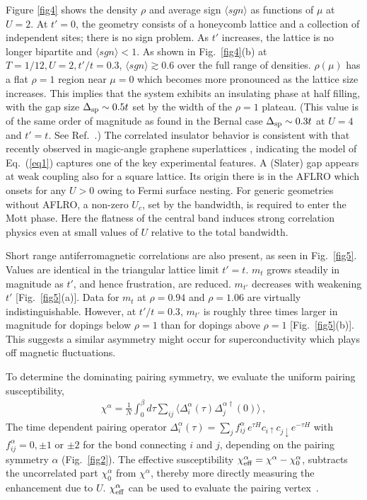 \documentclass[%
 reprint,
 amsmath,amssymb,
 aps,
]{revtex4-1}
\begin{document}
Figure \ref{fig4} shows the density $\rho$ and average sign
$\langle sgn \rangle$ as functions of
$\mu$ at $U=2$.   At $t'=0$, the geometry consists of a honeycomb lattice
and a collection of independent sites; there is no sign problem.
As $t'$ increases, the lattice is no longer bipartite and
$\langle sgn \rangle < 1$.
As shown in Fig.~\ref{fig4}(b) at $T=1/12, U=2, t'/t=0.3$,
$\langle sgn \rangle \gtrsim 0.6$ over the full range
of densities.  $\rho(\mu)$
has a flat $\rho=1$ region near $\mu=0$ which becomes more
pronounced as the lattice size increases.
This implies that the system exhibits an insulating phase
at half filling, with the gap size $\Delta_{\rm sp} \sim 0.5t$
set by the width of the $\rho=1$ plateau.
(This value is of the same order of magnitude as found in the Bernal case
$\Delta_{\rm sp} \sim 0.3t$ at $U=4$ and $t'=t$.
See Ref.~\cite{lang12}.)
The correlated insulator behavior
is consistent with that recently observed in magic-angle
graphene superlattices \cite{cao18a}, indicating
the model of Eq.~(\ref{eq1}) captures one of the key experimental
features.  A (Slater) gap appears at weak coupling also for a
square lattice.  Its origin there is in the AFLRO
which onsets for any $U>0$ owing to Fermi surface nesting.
For generic geometries without AFLRO, a non-zero $U_c$, set by the bandwidth,
is required to enter the Mott phase.  Here the flatness of the
central band induces strong correlation physics even at small
values of $U$ relative to the total bandwidth.

Short range antiferromagnetic correlations are also present, as seen in
Fig.~\ref{fig5}.
Values are identical
in the triangular lattice limit $t'=t$. $m_t$ grows steadily in
magnitude as $t'$, and hence frustration, are reduced.  $m_{t'}$
decreases with weakening $t'$ [Fig.~\ref{fig5}(a)].
Data for $m_t$ at $\rho=0.94$ and $\rho=1.06$ are virtually
indistinguishable.  However, at $t'/t=0.3$, $m_{t'}$ is roughly
three times larger in magnitude for dopings below $\rho=1$
than for dopings above $\rho=1$ [Fig.~\ref{fig5}(b)].
This suggests a similar asymmetry might occur
for superconductivity which plays off magnetic fluctuations.

To determine the dominating pairing symmetry, we evaluate
the uniform pairing susceptibility,
\begin{eqnarray}\label{eq4}
\chi^{\alpha}=\frac{1}{N}\int_{0}^{\beta}d\tau \sum_{ij}\langle
\Delta^{\alpha}_{i}(\tau)\Delta^{\alpha\dagger}_{j}(0)\rangle
\,,
\end{eqnarray}
The time dependent pairing operator
$\Delta_{i}^{\alpha}(\tau)= \sum_{j}f_{ij}^{\alpha}\,e^{\tau
H}c_{i\uparrow}c_{j\downarrow} e^{-\tau H}$ with $f_{ij}^{\alpha}=0, \pm
1$ or $\pm 2$ for the bond connecting $i$ and $j$, depending on the
pairing symmetry $\alpha$ (Fig.~\ref{fig2}).   The effective
susceptibility $\chi_{\rm eff}^{\alpha}=\chi^{\alpha}-\chi_{0}^{\alpha}$,
subtracts the uncorrelated part $\chi_{0}^{\alpha}$
from $\chi^{\alpha}$, thereby more directly measuring the enhancement
due to $U$.  $\chi^\alpha_{\rm eff}$ can be used to evaluate the
pairing vertex~\cite{sc2,sc3}.
\end{document}
